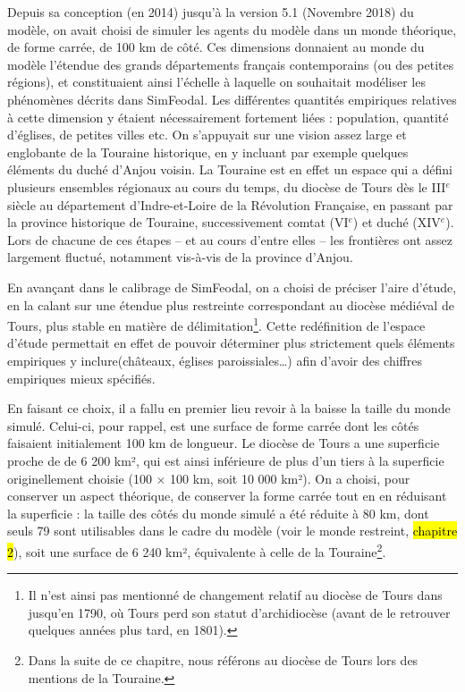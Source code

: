 Depuis sa conception (en 2014) jusqu'à la version 5.1 (Novembre 2018) du modèle, on avait choisi de simuler les agents du modèle dans un monde théorique, de forme carrée, de 100 km de côté.
Ces dimensions donnaient au monde du modèle l'étendue des grands départements français contemporains (ou des petites régions), et constituaient ainsi l'échelle à laquelle on souhaitait modéliser les phénomènes décrits dans SimFeodal.
Les différentes quantités empiriques relatives à cette dimension y étaient nécessairement fortement liées : population, quantité d'églises, de petites villes etc.
On s'appuyait sur une vision assez large et englobante de la Touraine historique, en y incluant par exemple quelques éléments du duché d'Anjou voisin.
La Touraine est en effet un espace qui a défini plusieurs ensembles régionaux au cours du temps, du diocèse de Tours dès le III$^e$ siècle au département d'Indre-et-Loire de la Révolution Française, en passant par la province historique de Touraine, successivement comtat (VI$^e$) et duché (XIV$^e$).
Lors de chacune de ces étapes -- et au cours d'entre elles -- les frontières ont assez largement fluctué, notamment vis-à-vis de la province d'Anjou.

En avançant dans le calibrage de SimFeodal, on a choisi de préciser l'aire d'étude, en la calant sur une étendue plus restreinte correspondant au diocèse médiéval de Tours, plus stable en matière de délimitation\footnote{
	Il n'est ainsi pas mentionné de changement relatif au diocèse de Tours dans \textcite[309--326]{mirot1947manuel} jusqu'en 1790, où Tours perd son statut d'archidiocèse (avant de le retrouver quelques années plus tard, en 1801).
}.
Cette redéfinition de l'espace d'étude permettait en effet de pouvoir déterminer plus strictement quels éléments empiriques y inclure(châteaux, églises paroissiales\ldots) afin d'avoir des chiffres empiriques mieux spécifiés.

En faisant ce choix, il a fallu en premier lieu revoir à la baisse la taille du monde simulé.
Celui-ci, pour rappel, est une surface de forme carrée dont les côtés faisaient initialement 100 km de longueur.
Le diocèse de Tours a une superficie proche de de 6 200 km², qui est ainsi inférieure de plus d'un tiers à la superficie originellement choisie (100 $\times$ 100 km, soit 10 000 km²).
On a choisi, pour conserver un aspect théorique, de conserver la forme carrée tout en en réduisant la superficie : la taille des côtés du monde simulé a été réduite à 80 km, dont seuls 79 sont utilisables dans le cadre du modèle (voir le monde restreint, \hl{chapitre 2}), soit une surface de 6 240 km², équivalente à celle de la Touraine\footnote{
	Dans la suite de ce chapitre, nous référons au diocèse de Tours lors des mentions de la Touraine.
}.

